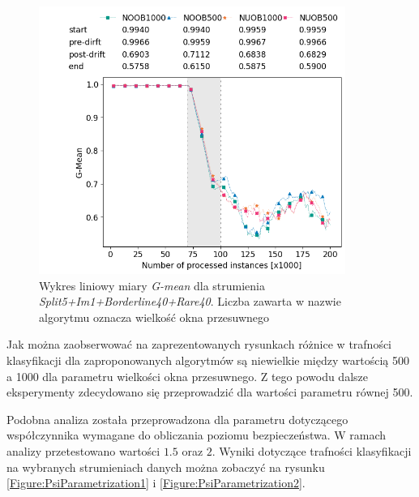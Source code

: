 \begin{figure}[h]
    \centering
    \includegraphics[width=10cm]{figures/split5im1borderline40rare40_window.png}
    \caption{Wykres liniowy miary \textit{G-mean} dla strumienia \textit{Split5+Im1+Borderline40+Rare40}. Liczba zawarta w nazwie algorytmu oznacza wielkość okna przesuwnego}\label{Figure:WindowParametrization2}
\end{figure}


\noindent Jak można zaobserwować na zaprezentowanych rysunkach różnice w trafności klasyfikacji dla zaproponowanych algorytmów są niewielkie między wartością 500 a 1000 dla parametru wielkości okna przesuwnego. Z tego powodu dalsze eksperymenty zdecydowano się przeprowadzić dla wartości parametru równej 500.

Podobna analiza została przeprowadzona dla parametru dotyczącego współczynnika wymagane do obliczania poziomu bezpieczeństwa. W ramach analizy przetestowano wartości $1.5$ oraz $2$. Wyniki dotyczące trafności klasyfikacji na wybranych strumieniach danych można zobaczyć na rysunku \ref{Figure:PsiParametrization1} i \ref{Figure:PsiParametrization2}.

